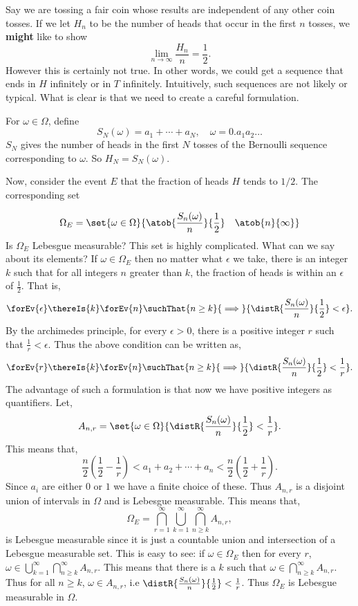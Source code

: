 Say we are tossing a fair coin whose results are independent of any other coin tosses. 
If we let $H_n$ to be the number of heads that occur in the first $n$ tosses, we \textbf{might} like
to show
\[\lim\limits_{n\to\infty}\frac{H_n}{n} = \frac{1}{2}.\]
However this is certainly not true. In other words, we could get a sequence that ends in $H$
infinitely or in $T$ infinitely. Intuitively, such sequences are not likely or typical. What is
clear is that we need to create a careful formulation.

\begin{Definition}[name=Number of Heads]
    For $\omega \in \Omega$, define
    \[S_N(\omega) = a_1 + \cdots + a_N,\quad \omega = 0.a_1a_2\dots\]
    $S_N$ gives the number of heads in the first $N$ tosses of the Bernoulli sequence corresponding
    to $\omega$. So $H_N = S_N(\omega)$.
\end{Definition}
Now, consider the event $E$ that the fraction of heads $H$ tends to $1/2$. The corresponding set 

\begin{equation}\label{eq:SLLN_lebesgue_set}
    \Omega_{E} = \set{\omega\in\Omega}{\atob{\frac{S_n(\omega)}{n}}{\frac{1}{2}}\quad\atob{n}{\infty}}
\end{equation}
Is $\Omega_{E}$ Lebesgue measurable? This set is highly complicated. What can we say about its
elements? If $\omega \in \Omega_{E}$ then no matter what $\epsilon$ we take, there is an
integer $k$ such that for all integers $n$ greater than $k$, the fraction of heads is within an
$\epsilon$ of $\frac{1}{2}$. That is,
\[\forEv{\epsilon}\thereIs{k}\forEv{n}\suchThat{n\geq
	k}{\implies}{\distR{\frac{S_n(\omega)}{n}}{\frac{1}{2}} < \epsilon}.\]
By the archimedes principle, for every $\epsilon > 0$, there is a positive integer $r$ such that
$\frac{1}{r} < \epsilon$. Thus the above condition can be written as,
\[\forEv{r}\thereIs{k}\forEv{n}\suchThat{n\geq
	k}{\implies}{\distR{\frac{S_n(\omega)}{n}}{\frac{1}{2}} < \frac{1}{r}}.\]
The advantage of such a formulation is that now we have positive integers as quantifiers. Let,
\[A_{n,r} = \set{\omega\in\Omega}{\distR{\frac{S_n(\omega)}{n}}{\frac{1}{2}} < \frac{1}{r}}.\]
This means that,
\[\frac{n}{2}(\frac{1}{2} - \frac{1}{r}) < a_1 + a_2 + \cdots + a_n < 
    \frac{n}{2}(\frac{1}{2} + \frac{1}{r}).\]
Since $a_i$ are either $0$ or $1$ we have a finite choice of these. Thus $A_{n,r}$ is a disjoint
union of intervals in $\Omega$ and is Lebesgue measurable. This means that,
\[\Omega_{E} = \bigcap\limits_{r = 1}^{\infty}\bigcup\limits_{k = 1}^{\infty}\bigcap\limits_{n\geq
    k}^{\infty}A_{n,r},\]
is Lebesgue measurable since it is just a countable union and intersection of a Lebesgue measurable
set. This is easy to see: if $\omega \in \Omega_{E}$ then for every $r$, 
$\omega \in \bigcup\limits_{k = 1}^{\infty}\bigcap\limits_{n\geq k}^{\infty}A_{n,r}$. This means that
there is a $k$ such that $\omega \in \bigcap\limits_{n\geq k}^{\infty}A_{n,r}$. Thus for all $n \geq
k$, $\omega \in A_{n,r}$, i.e $\distR{\frac{S_n(\omega)}{n}}{\frac{1}{2}} < \frac{1}{r}$.
Thus $\Omega_{E}$ is Lebesgue measurable in $\Omega$. 

